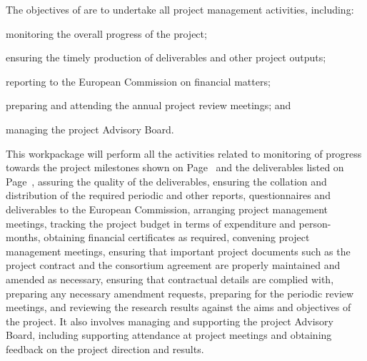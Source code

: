 \addtocounter{wpno}{1}

\begin{Workpackage}{\thewpno}
\WPTitle{\wpname{\thewpno}}


\begin{WPObjectives}
The objectives of \theWP{} are to undertake all project management activities, including:
\begin{compactitem}
\item
monitoring the overall progress of the project;
\item
ensuring the timely production of deliverables and other project outputs;
\item
reporting to the European Commission on financial matters;
\item
preparing and attending the annual project review meetings; and

\item
managing the project Advisory Board.
\end{compactitem}
\end{WPObjectives}

\begin{WPDescription}
This workpackage will perform all the activities related to monitoring
of progress towards the project milestones shown on Page~\pageref{sect:milestones}
and the deliverables listed on Page~\pageref{sect:deliverables},
assuring the quality of the deliverables, ensuring the
collation and distribution of the required periodic and other reports,
questionnaires and deliverables to
the European Commission, arranging project management meetings, tracking
the project budget in terms of expenditure and person-months,
obtaining financial certificates as required, convening project
management meetings, ensuring that important project documents
such as the project contract and the consortium agreement are
properly maintained and amended as necessary, ensuring that
contractual details are complied with, preparing any necessary amendment requests,
preparing for the periodic review meetings, and reviewing the research
results against the aims and objectives of the project.
It also involves managing and supporting the project
Advisory Board, including supporting attendance at project
meetings and obtaining feedback on the project direction and
results.
\end{WPDescription}


\end{Workpackage}

